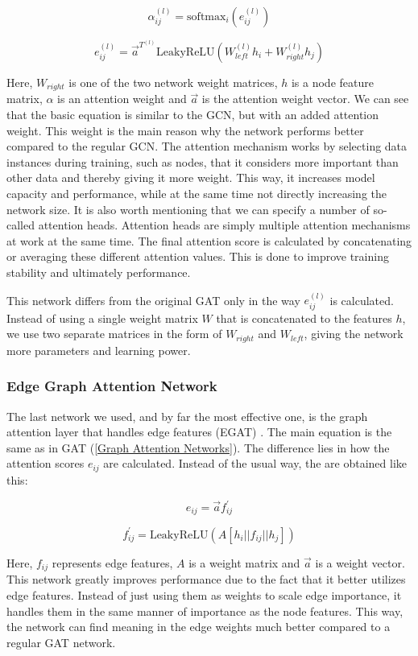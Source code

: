 \documentclass[times, utf8, diplomski, english]{fer_eng}
\begin{document}
\[ \alpha_{ij}^{(l)} = \mathrm{softmax}_i (e_{ij}^{(l)}) \]

\[ e_{ij}^{(l)} = \vec{a}^{T^{(l)}} \mathrm{LeakyReLU} (W_{left}^{(l)} h_i + W_{right}^{(l)} h_j) \]

Here, $W_{right}$ is one of the two network weight matrices, $h$ is a node feature matrix, $\alpha$ is an attention weight and $\vec{a}$ is the attention weight vector. We can see that the basic equation is similar to the GCN, but with an added attention weight. This weight is the main reason why the network performs better compared to the regular GCN. The attention mechanism works by selecting data instances during training, such as nodes, that it considers more important than other data and thereby giving it more weight. This way, it increases model capacity and performance, while at the same time not directly increasing the network size. It is also worth mentioning that we can specify a number of so-called attention heads. Attention heads are simply multiple attention mechanisms at work at the same time. The final attention score is calculated by concatenating or averaging these different attention values. This is done to improve training stability and ultimately performance.

This network differs from the original GAT only in the way $e_{ij}^{(l)}$ is calculated. Instead of using a single weight matrix $W$ that is concatenated to the features $h$, we use two separate matrices in the form of $W_{right}$ and $W_{left}$, giving the network more parameters and learning power.

\subsubsection{Edge Graph Attention Network}

The last network we used, and by far the most effective one, is the graph attention layer that handles edge features (EGAT) \cite{EGAT}. The main equation is the same as in GAT (\ref{Graph Attention Networks}). The difference lies in how the attention scores $e_{ij}$ are calculated. Instead of the usual way, the are obtained like this:

\[ e_{ij} = \vec{a} f_{ij}^{'} \]

\[ f_{ij}^{'} = \mathrm{LeakyReLU} (A[h_i||f_{ij}||h_j]) \]

Here, $f_{ij}$ represents edge features, $A$ is a weight matrix and $\vec{a}$ is a weight vector. This network greatly improves performance due to the fact that it better utilizes edge features. Instead of just using them as weights to scale edge importance, it handles them in the same manner of importance as the node features. This way, the network can find meaning in the edge weights much better compared to a regular GAT network.
\end{document}
